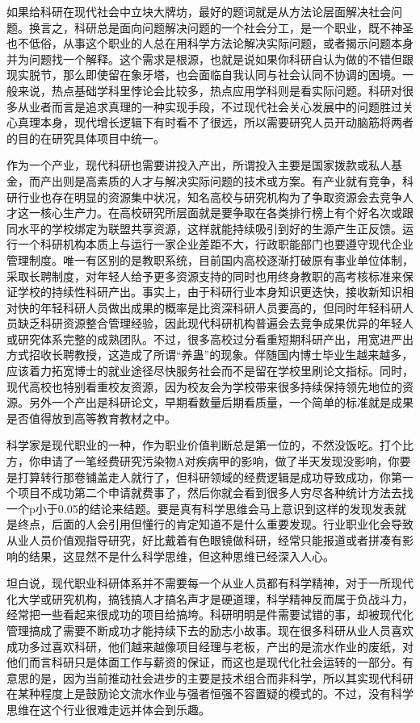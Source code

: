 \documentclass[]{tufte-book}
\begin{document}
如果给科研在现代社会中立块大牌坊，最好的题词就是从方法论层面解决社会问题。换言之，科研总是面向问题解决问题的一个社会分工，是一个职业，既不神圣也不低俗，从事这个职业的人总在用科学方法论解决实际问题，或者揭示问题本身并为问题找一个解释。这个需求是根源，也就是说如果你科研自认为做的不错但跟现实脱节，那么即使留在象牙塔，也会面临自我认同与社会认同不协调的困境。一般来说，热点基础学科里悖论会比较多，热点应用学科则是看实际问题。科研对很多从业者而言是追求真理的一种实现手段，不过现代社会关心发展中的问题胜过关心真理本身，现代增长逻辑下有时看不了很远，所以需要研究人员开动脑筋将两者的目的在研究具体项目中统一。

作为一个产业，现代科研也需要讲投入产出，所谓投入主要是国家拨款或私人基金，而产出则是高素质的人才与解决实际问题的技术或方案。有产业就有竞争，科研行业也存在明显的资源集中状况，知名高校与研究机构为了争取资源会去竞争人才这一核心生产力。在高校研究所层面就是要争取在各类排行榜上有个好名次或跟同水平的学校绑定为联盟共享资源，这样就能持续吸引到好的生源产生正反馈。运行一个科研机构本质上与运行一家企业差距不大，行政职能部门也要遵守现代企业管理制度。唯一有区别的是教职系统，目前国内高校逐渐打破原有事业单位体制，采取长聘制度，对年轻人给予更多资源支持的同时也用终身教职的高考核标准来保证学校的持续性科研产出。事实上，由于科研行业本身知识更迭快，接收新知识相对快的年轻科研人员做出成果的概率是比资深科研人员要高的，但同时年轻科研人员缺乏科研资源整合管理经验，因此现代科研机构普遍会去竞争成果优异的年轻人或研究体系完整的成熟团队。不过，很多高校过分看重短期科研产出，用宽进严出方式招收长聘教授，这造成了所谓``养蛊''的现象。伴随国内博士毕业生越来越多，应该着力拓宽博士的就业途径尽快服务社会而不是留在学校里刷论文指标。同时，现代高校也特别看重校友资源，因为校友会为学校带来很多持续保持领先地位的资源。另外一个产出是科研论文，早期看数量后期看质量，一个简单的标准就是成果是否值得放到高等教育教材之中。

科学家是现代职业的一种，作为职业价值判断总是第一位的，不然没饭吃。打个比方，你申请了一笔经费研究污染物A对疾病甲的影响，做了半天发现没影响，你要是打算转行那卷铺盖走人就行了，但科研领域的经费逻辑是成功导致成功，你第一个项目不成功第二个申请就费事了，然后你就会看到很多人穷尽各种统计方法去找一个p小于0.05的结论来结题。要是真有科学思维会马上意识到这样的发现发表就是终点，后面的人会引用但懂行的肯定知道不是什么重要发现。行业职业化会导致从业人员价值观指导研究，好比戴着有色眼镜做科研，经常只能报道或者拼凑有影响的结果，这显然不是什么科学思维，但这种思维已经深入人心。

坦白说，现代职业科研体系并不需要每一个从业人员都有科学精神，对于一所现代化大学或研究机构，搞钱搞人才搞名声才是硬道理，科学精神反而属于负战斗力，经常把一些看起来很成功的项目给搞垮。科研明明是件需要试错的事，却被现代化管理搞成了需要不断成功才能持续下去的励志小故事。现在很多科研从业人员喜欢成功多过喜欢科研，他们越来越像项目经理与老板，产出的是流水作业的废纸，对他们而言科研只是体面工作与薪资的保证，而这也是现代化社会运转的一部分。有意思的是，因为当前推动社会进步的主要是技术组合而非科学，所以其实现代科研在某种程度上是鼓励论文流水作业与强者恒强不容置疑的模式的。不过，没有科学思维在这个行业很难走远并体会到乐趣。
\end{document}
